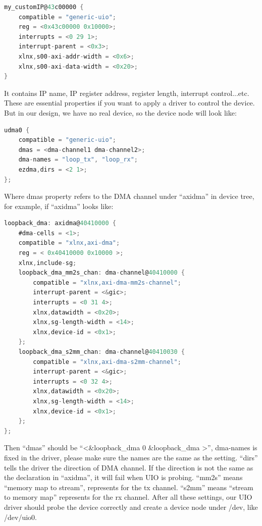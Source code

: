 {\renewcommand\baselinestretch{0.8}\selectfont
\begin{lstlisting}[frame=single,language=C]
my_customIP@43c00000 {
	compatible = "generic-uio";
	reg = <0x43c00000 0x10000>;
	interrupts = <0 29 1>;
	interrupt-parent = <0x3>;
	xlnx,s00-axi-addr-width = <0x6>;
	xlnx,s00-axi-data-width = <0x20>;
}
\end{lstlisting}
\par}

It contains IP name, IP register address, register length, interrupt control...etc. These are essential properties if you want to apply a driver to control the device. But in our design, we have no real device, so the device node will look like:

{\renewcommand\baselinestretch{0.8}\selectfont
\begin{lstlisting}[frame=single,language=C]
udma0 {
    compatible = "generic-uio";
    dmas = <dma-channel1 dma-channel2>;
    dma-names = "loop_tx", "loop_rx";   
    ezdma,dirs = <2 1>;                 
};
\end{lstlisting}
\par}

Where dmas property refers to the DMA channel under ``axidma'' in device tree, for example, if ``axidma'' looks like:

{\renewcommand\baselinestretch{0.8}\selectfont
\begin{lstlisting}[frame=single,language=C]
loopback_dma: axidma@40410000 {
    #dma-cells = <1>;
    compatible = "xlnx,axi-dma";
    reg = < 0x40410000 0x10000 >;
    xlnx,include-sg;
    loopback_dma_mm2s_chan: dma-channel@40410000 {
        compatible = "xlnx,axi-dma-mm2s-channel";
        interrupt-parent = <&gic>;
        interrupts = <0 31 4>; 
        xlnx,datawidth = <0x20>;        
        xlnx,sg-length-width = <14>;    
        xlnx,device-id = <0x1>;     
    };
	loopback_dma_s2mm_chan: dma-channel@40410030 {
        compatible = "xlnx,axi-dma-s2mm-channel";
        interrupt-parent = <&gic>;
        interrupts = <0 32 4>;  
        xlnx,datawidth = <0x20>;       
        xlnx,sg-length-width = <14>;    
        xlnx,device-id = <0x1>;    
    };
};
\end{lstlisting}
\par}

Then ``dmas'' should be ``<\&loopback\_dma 0 \&loopback\_dma >'', dma-names is fixed in the driver, please make sure the names are the same as the setting. ``dirs'' tells the driver the direction of DMA channel. If the direction is not the same as the declaration in ``axidma'', it will fail when UIO is probing. ``mm2s'' means ``memory map to stream'', represents for the tx channel. ``s2mm'' means ``stream to memory map'' represents for the rx channel. After all these settings, our UIO driver should probe the device correctly and create a device node under /dev, like /dev/uio0.

